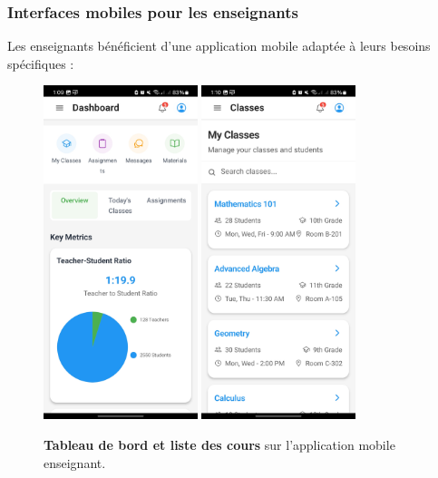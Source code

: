 \subsubsection{Interfaces mobiles pour les enseignants}

Les enseignants bénéficient d'une application mobile adaptée à leurs besoins spécifiques :

\begin{figure}[H]
  \centering
  \includegraphics[width=0.4\textwidth,keepaspectratio]{pfe-pics/Mobile /Teacher/Screenshot_20250610_130952_Expo Go.jpg}
  \includegraphics[width=0.4\textwidth,keepaspectratio]{pfe-pics/Mobile /Teacher/Screenshot_20250610_131009_Expo Go.jpg}
  \caption{\textbf{Tableau de bord et liste des cours} sur l'application mobile enseignant.}
  \label{fig:mobile_teacher_dashboard}
\end{figure}

